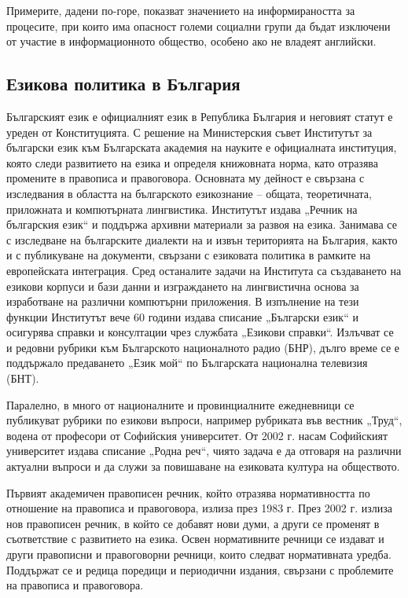 \documentclass[]{../../metanetpaper}
\begin{document}
\begin{multicols}{2}
Примерите, дадени по-горе, показват значението на информираността за процесите, при които има опасност големи социални
 групи
 да
 бъдат
 изключени
 от
 участие
 в
 информационното общество, особено ако не владеят
 английски.

\subsection{Езикова политика в България}


Българският език е официалният език в Република България и неговият статут е уреден от Конституцията. С
 решение на Министерския съвет Институтът за български език към Българската академия на науките е
 официалната институция, която следи развитието на
 езика и определя книжовната норма, като отразява промените в правописа и правоговора. Основната му дейност е свързана с изследвания в областта на българското езикознание – общата, теоретичната, приложната и компютърната лингвистика. Институтът издава „Речник на българския език“ и поддържа архивни
 материали за развоя на езика. Занимава се с изследване
 на българските диалекти на и извън територията на
 България, както и с публикуване на документи, свързани
 с езиковата политика в рамките на европейската
 интеграция. Сред останалите задачи на Института са
 създаването на езикови корпуси и бази данни и
 изграждането на лингвистична основа за изработване на
 различни компютърни приложения. В изпълнение на
 тези функции Институтът вече 60 години издава
 списание „Български език“ и
 осигурява справки и консултации чрез службата
 „Езикови справки“. Излъчват се и редовни рубрики към
 Българското националното радио (БНР), дълго време се е поддържало предаването „Език
 мой“ по Българската национална телевизия (БНТ).
 
Паралелно, в много от националните и провинциалните ежедневници се публикуват рубрики по езикови въпроси,
 например рубриката във вестник „Труд“, водена от
 професори от Софийския университет. От 2002 г. насам
 Софийският университет издава списание „Родна реч“,
 чиято задача е да отговаря на различни актуални
 въпроси и да служи за повишаване на езиковата култура на
 обществото.


Първият академичен правописен речник,
 който отразява нормативността по отношение на
 правописа и правоговора, излиза през 1983 г. През 2002
 г. излиза нов правописен речник, в който се добавят
 нови думи, а други се променят в съответствие с
 развитието на езика.
 Освен нормативните речници се издават и други
 правописни и правоговорни речници, които следват
 нормативната уредба. Поддържат се и редица поредици и периодични издания,
 свързани с проблемите на правописа и правоговора.


\end{multicols}
\end{document}
